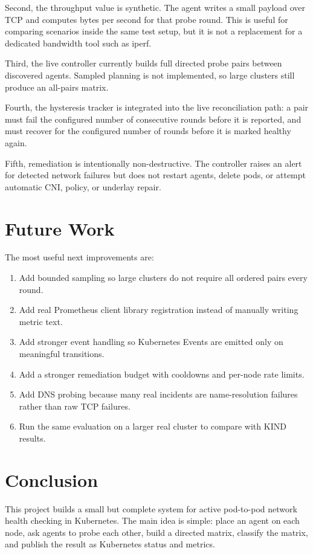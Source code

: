 \documentclass[11pt,a4paper]{article}
\begin{document}
Second, the throughput value is synthetic. The agent writes a small payload over TCP and computes bytes per second for that probe round. This is useful for comparing scenarios inside the same test setup, but it is not a replacement for a dedicated bandwidth tool such as iperf.

Third, the live controller currently builds full directed probe pairs between discovered agents. Sampled planning is not implemented, so large clusters still produce an all-pairs matrix.

Fourth, the hysteresis tracker is integrated into the live reconciliation path: a pair must fail the configured number of consecutive rounds before it is reported, and must recover for the configured number of rounds before it is marked healthy again.

Fifth, remediation is intentionally non-destructive. The controller raises an alert for detected network failures but does not restart agents, delete pods, or attempt automatic CNI, policy, or underlay repair.

\section{Future Work}

The most useful next improvements are:

\begin{enumerate}
  \item Add bounded sampling so large clusters do not require all ordered pairs every round.
  \item Add real Prometheus client library registration instead of manually writing metric text.
  \item Add stronger event handling so Kubernetes Events are emitted only on meaningful transitions.
  \item Add a stronger remediation budget with cooldowns and per-node rate limits.
  \item Add DNS probing because many real incidents are name-resolution failures rather than raw TCP failures.
  \item Run the same evaluation on a larger real cluster to compare with KIND results.
\end{enumerate}

\section{Conclusion}

This project builds a small but complete system for active pod-to-pod network health checking in Kubernetes. The main idea is simple: place an agent on each node, ask agents to probe each other, build a directed matrix, classify the matrix, and publish the result as Kubernetes status and metrics.
\end{document}
